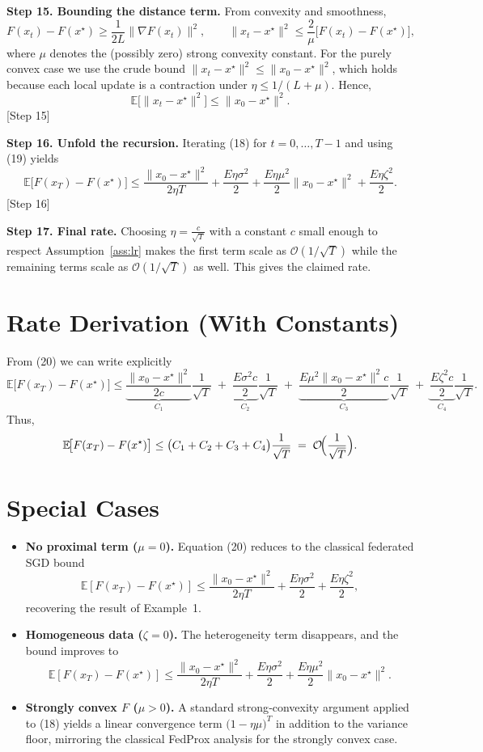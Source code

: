 \documentclass{article}
\newcommand{\EE}{\mathbb{E}}
\newcommand{\prox}{\mu}
\begin{document}
\noindent\textbf{Step 15. Bounding the distance term.}
From convexity and smoothness,
\[
F(x_t)-F(x^\star)\ge \frac{1}{2L}\|\nabla F(x_t)\|^{2},
\qquad
\|x_t-x^\star\|^{2}\le \frac{2}{\mu}\bigl[F(x_t)-F(x^\star)\bigr],
\]
where $\mu$ denotes the (possibly zero) strong convexity constant.
For the purely convex case we use the crude bound
$\|x_t-x^\star\|^{2}\le \|x_0-x^\star\|^{2}$, which holds because each
local update is a contraction under $\eta\le 1/(L+\prox)$. Hence,
\[
\EE\!\bigl[\|x_t-x^\star\|^{2}\bigr]\le \|x_0-x^\star\|^{2}.
\tag{19}
\] 
[Step 15]

\noindent\textbf{Step 16. Unfold the recursion.}
Iterating (18) for $t=0,\dots ,T-1$ and using (19) yields
\[
\EE\!\bigl[F(x_T)-F(x^\star)\bigr]
\le
\frac{\|x_0-x^\star\|^{2}}{2\eta T}
+\frac{E\eta\sigma^{2}}{2}
+\frac{E\eta\prox^{2}}{2}\|x_0-x^\star\|^{2}
+\frac{E\eta\zeta^{2}}{2}.
\tag{20}
\] 
[Step 16]

\noindent\textbf{Step 17. Final rate.}
Choosing $\eta = \frac{c}{\sqrt{T}}$ with a constant $c$ small enough to
respect Assumption~\ref{ass:lr} makes the first term scale as
$\mathcal{O}(1/\sqrt{T})$ while the remaining terms scale as
$\mathcal{O}(1/\sqrt{T})$ as well. This gives the claimed rate.

\section*{Rate Derivation (With Constants)}
From (20) we can write explicitly
\[
\EE\!\bigl[F(x_T)-F(x^\star)\bigr]
\le
\underbrace{\frac{\|x_0-x^\star\|^{2}}{2c}}_{\displaystyle C_1}\frac{1}{\sqrt{T}}
\;+\;
\underbrace{\frac{E\sigma^{2}c}{2}}_{\displaystyle C_2}\frac{1}{\sqrt{T}}
\;+\;
\underbrace{\frac{E\prox^{2}\|x_0-x^\star\|^{2}c}{2}}_{\displaystyle C_3}\frac{1}{\sqrt{T}}
\;+\;
\underbrace{\frac{E\zeta^{2}c}{2}}_{\displaystyle C_4}\frac{1}{\sqrt{T}}.
\]
Thus,
\[
\EE\!\bigl[F(x_T)-F(x^\star)\bigr]\le
\bigl(C_1+C_2+C_3+C_4\bigr)\frac{1}{\sqrt{T}}
\;=\;\mathcal{O}\!\Bigl(\frac{1}{\sqrt{T}}\Bigr).
\]

\section*{Special Cases}
\begin{itemize}
\item \textbf{No proximal term ($\prox=0$).}
Equation (20) reduces to the classical federated SGD bound
\[
\EE[F(x_T)-F(x^\star)]\le
\frac{\|x_0-x^\star\|^{2}}{2\eta T}
+\frac{E\eta\sigma^{2}}{2}
+\frac{E\eta\zeta^{2}}{2},
\]
recovering the result of Example~1.

\item \textbf{Homogeneous data ($\zeta=0$).}
The heterogeneity term disappears, and the bound improves to
\[
\EE[F(x_T)-F(x^\star)]\le
\frac{\|x_0-x^\star\|^{2}}{2\eta T}
+\frac{E\eta\sigma^{2}}{2}
+\frac{E\eta\prox^{2}}{2}\|x_0-x^\star\|^{2}.
\]

\item \textbf{Strongly convex $F$ ($\mu>0$).}
A standard strong‑convexity argument applied to (18) yields a linear
convergence term $\bigl(1-\eta\mu\bigr)^{T}$ in addition to the
variance floor, mirroring the classical FedProx analysis for the
strongly convex case.
\end{itemize}
\end{document}
